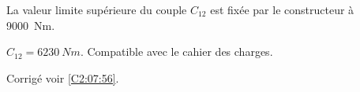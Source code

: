 La valeur limite supérieure du couple $C_{12}$ est fixée par le constructeur à \SI{9000}{Nm}.

\ifprof
 $C_{12} = \SI{6230}{Nm}$. Compatible avec le cahier des charges. 
\else
\fi







\ifprof
\else
\begin{flushright}
\footnotesize{Corrigé  voir \ref{C2:07:56}.}
\end{flushright}%
\fi 